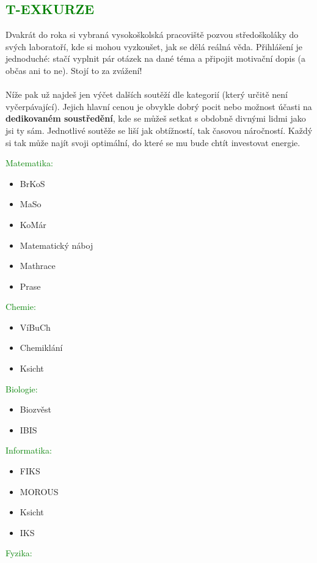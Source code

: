 \documentclass{article}
\newcommand{\podnadpiss}[1]{
  \subsection*{\textcolor{green}{#1}}
}
\begin{document}
\podnadpiss{T-EXKURZE}
Dvakrát do roka si vybraná vysokoškolská pracoviště pozvou středoškoláky do svých laboratoří, kde si mohou vyzkoušet, jak se dělá reálná věda. Přihlášení je jednoduché: stačí vyplnit pár otázek na dané téma a připojit motivační dopis (a občas ani to ne). Stojí to za zvážení!
\\\\
\noindent Níže pak už najdeš jen výčet dalších soutěží dle kategorií (který určitě není vyčerpávající). Jejich hlavní cenou je obvykle dobrý pocit nebo možnost účasti na \textbf{dedikovaném soustředění}, kde se můžeš setkat s obdobně divnými lidmi jako jsi ty sám. Jednotlivé soutěže se liší jak obtížností, tak časovou náročností. Každý si tak může najít svoji optimální, do které se mu bude chtít investovat energie.

\begin{multicols}{3}
  \footnotesize
  \noindent\textcolor{green}{Matematika:}
  \begin{itemize}[leftmargin=10pt]
    \item BrKoS
    \item MaSo
    \item KoMár
    \item Matematický náboj
    \item Mathrace
    \item Prase
  \end{itemize}
  \textcolor{green}{Chemie:}
  \begin{itemize}[leftmargin=10pt]
    \item VíBuCh
    \item Chemiklání
    \item Ksicht
  \end{itemize}
  \vfill\null\columnbreak
    \textcolor{green}{Biologie:}
    \begin{itemize}[leftmargin=10pt]
      \item Biozvěst
      \item IBIS
    \end{itemize}
    \textcolor{green}{Informatika:}
    \begin{itemize}[leftmargin=10pt]
      \item FIKS
      \item MOROUS
      \item Ksicht
      \item IKS
    \end{itemize}
\vfill\null\columnbreak
      \textcolor{green}{Fyzika:}
      \begin{itemize}[leftmargin=10pt]

\end{itemize}
\end{multicols}
\end{document}
